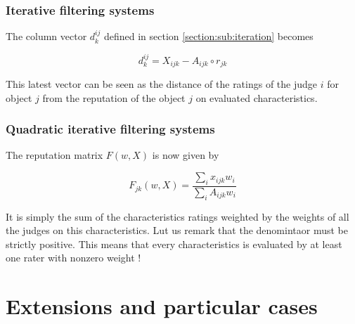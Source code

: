 \documentclass[12pt,a4paper]{article}
\begin{document}
\subsubsection{Iterative filtering systems}
 The column vector $d_k^{ij}$ defined in section \ref{section:sub:iteration} becomes
 
\[
    d^{ij}_k = X_{ijk} - A_{ijk}   \circ r_{jk}
\]


This latest vector can be seen as the distance of the ratings of the judge $i$ for object $j$ from the reputation of the object $j$ on evaluated characteristics.

\subsubsection{Quadratic iterative filtering systems}

The reputation matrix $F(w, X)$ is now given by

\[
    F_{jk}(w, X) = \frac{\sum_i x_{ijk}w_i}{\sum_i A_{ijk}w_i}
\]

It is simply the sum of the characteristics ratings weighted by the weights of all the judges on this characteristics. Lut us remark that the denomintaor must be strictly positive. This means that every characteristics is evaluated by at least one rater with nonzero weight !







\section{Extensions and particular cases}
\end{document}
